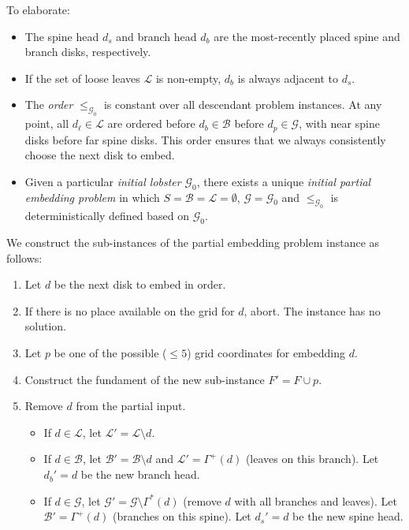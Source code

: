 \documentclass[draft,final]{vutinfth} %
\begin{document}
To elaborate:

\begin{itemize}
    \item The spine head $d_s$ and branch head $d_b$ are the most-recently placed spine and branch disks, respectively.
    \item If the set of loose leaves $\mathcal L$ is non-empty, $d_b$ is always adjacent to $d_s$.
    \item The \emph{order} $\leq_{\mathcal G_0}$ is constant over all descendant problem instances. At any point, all $d_\ell \in \mathcal L$ are ordered before $d_b \in \mathcal B$ before $d_p \in \mathcal G$, with near spine disks before far spine disks. This order ensures that we always consistently choose the next disk to embed.
    \item Given a particular \emph{initial lobster} $\mathcal G_0$, there exists a unique \emph{initial partial embedding problem} in which $S = \mathcal B = \mathcal L = \emptyset$, $\mathcal G = \mathcal G_0$ and $\leq_{\mathcal G_0}$ is deterministically defined based on $\mathcal G_0$.
\end{itemize}

\medskip

We construct the sub-instances of the partial embedding problem instance as follows:

\begin{enumerate}
    \item Let $d$ be the next disk to embed in order.
    \item If there is no place available on the grid for $d$, abort. The instance has no solution.
    \item Let $p$ be one of the possible ($\leq 5$) grid coordinates for embedding $d$.
    \item Construct the fundament of the new sub-instance $F' = F \cup p$.
    \item Remove $d$ from the partial input.
    \begin{itemize}
        \item If $d \in \mathcal L$, let $\mathcal L' = \mathcal L \setminus d$.
        \item If $d \in \mathcal B$, let $\mathcal B' = \mathcal B \setminus d$ and $\mathcal L' = \Gamma^+(d)$ (leaves on this branch). Let $d_b' = d$ be the new branch head.
        \item If $d \in \mathcal G$, let $\mathcal G' = \mathcal G \setminus \Gamma^*(d)$ (remove $d$ with all branches and leaves). Let $\mathcal B' = \Gamma^+(d)$ (branches on this spine). Let $d_s' = d$ be the new spine head.
    \end{itemize}
\end{enumerate}
\end{document}
